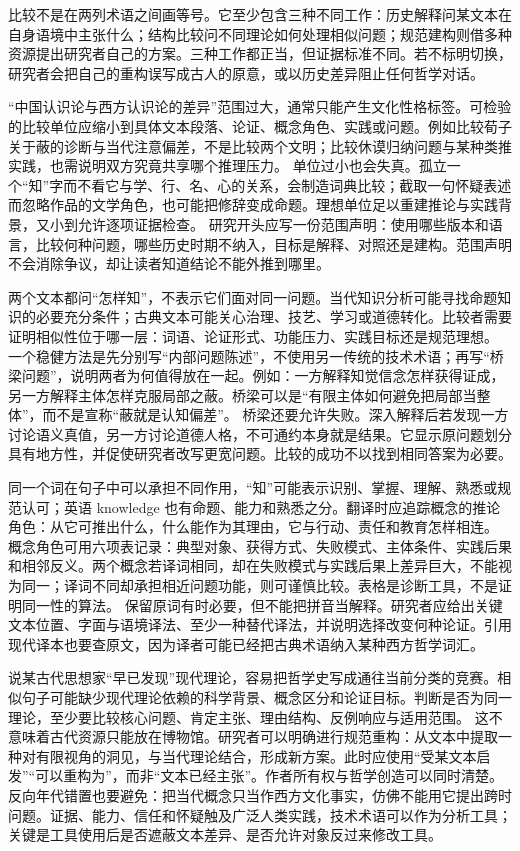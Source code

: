 比较不是在两列术语之间画等号。它至少包含三种不同工作：历史解释问某文本在自身语境中主张什么；结构比较问不同理论如何处理相似问题；规范建构则借多种资源提出研究者自己的方案。三种工作都正当，但证据标准不同。若不标明切换，研究者会把自己的重构误写成古人的原意，或以历史差异阻止任何哲学对话。

“中国认识论与西方认识论的差异”范围过大，通常只能产生文化性格标签。可检验的比较单位应缩小到具体文本段落、论证、概念角色、实践或问题。例如比较荀子关于蔽的诊断与当代注意偏差，不是比较两个文明；比较休谟归纳问题与某种类推实践，也需说明双方究竟共享哪个推理压力。 单位过小也会失真。孤立一个“知”字而不看它与学、行、名、心的关系，会制造词典比较；截取一句怀疑表述而忽略作品的文学角色，也可能把修辞变成命题。理想单位足以重建推论与实践背景，又小到允许逐项证据检查。 研究开头应写一份范围声明：使用哪些版本和语言，比较何种问题，哪些历史时期不纳入，目标是解释、对照还是建构。范围声明不会消除争议，却让读者知道结论不能外推到哪里。

两个文本都问“怎样知”，不表示它们面对同一问题。当代知识分析可能寻找命题知识的必要充分条件；古典文本可能关心治理、技艺、学习或道德转化。比较者需要证明相似性位于哪一层：词语、论证形式、功能压力、实践目标还是规范理想。 一个稳健方法是先分别写“内部问题陈述”，不使用另一传统的技术术语；再写“桥梁问题”，说明两者为何值得放在一起。例如：一方解释知觉信念怎样获得证成，另一方解释主体怎样克服局部之蔽。桥梁可以是“有限主体如何避免把局部当整体”，而不是宣称“蔽就是认知偏差”。 桥梁还要允许失败。深入解释后若发现一方讨论语义真值，另一方讨论道德人格，不可通约本身就是结果。它显示原问题划分具有地方性，并促使研究者改写更宽问题。比较的成功不以找到相同答案为必要。

同一个词在句子中可以承担不同作用，“知”可能表示识别、掌握、理解、熟悉或规范认可；英语 knowledge 也有命题、能力和熟悉之分。翻译时应追踪概念的推论角色：从它可推出什么，什么能作为其理由，它与行动、责任和教育怎样相连。 概念角色可用六项表记录：典型对象、获得方式、失败模式、主体条件、实践后果和相邻反义。两个概念若译词相同，却在失败模式与实践后果上差异巨大，不能视为同一；译词不同却承担相近问题功能，则可谨慎比较。表格是诊断工具，不是证明同一性的算法。 保留原词有时必要，但不能把拼音当解释。研究者应给出关键文本位置、字面与语境译法、至少一种替代译法，并说明选择改变何种论证。引用现代译本也要查原文，因为译者可能已经把古典术语纳入某种西方哲学词汇。

说某古代思想家“早已发现”现代理论，容易把哲学史写成通往当前分类的竞赛。相似句子可能缺少现代理论依赖的科学背景、概念区分和论证目标。判断是否为同一理论，至少要比较核心问题、肯定主张、理由结构、反例响应与适用范围。 这不意味着古代资源只能放在博物馆。研究者可以明确进行规范重构：从文本中提取一种对有限视角的洞见，与当代理论结合，形成新方案。此时应使用“受某文本启发”“可以重构为”，而非“文本已经主张”。作者所有权与哲学创造可以同时清楚。 反向年代错置也要避免：把当代概念只当作西方文化事实，仿佛不能用它提出跨时问题。证据、能力、信任和怀疑触及广泛人类实践，技术术语可以作为分析工具；关键是工具使用后是否遮蔽文本差异、是否允许对象反过来修改工具。

